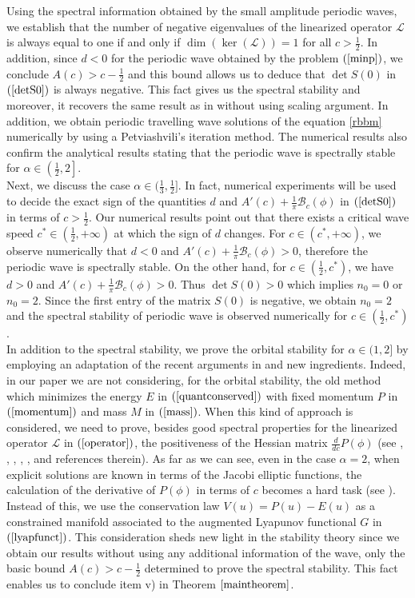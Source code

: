 \documentclass[12pt,reqno]{amsart}
\newcommand{\2}{L^2_{per}(0, T)}
\numberwithin{equation}{section}
\numberwithin{figure}{section}
\begin{document}
\indent Using the spectral information obtained by the small amplitude periodic waves, we establish that the number of negative eigenvalues of the linearized operator $\mathcal{L}$ is always equal to one if and only if $\dim(\ker({\mathcal{L}}))=1$ for all $c>\frac{1}{2}$. In addition, since $d<0$ for the periodic wave obtained by the problem $(\ref{minp})$, we conclude $A(c)>c-\frac{1}{2}$ and this bound allows us to deduce that $\det S(0)$ in $(\ref{detS0})$ is always negative. This fact gives us the spectral stability and moreover, it recovers the same result as in \cite{angulo1} without using scaling argument. In addition, we obtain periodic travelling wave solutions of the equation \eqref{rbbm} numerically by using a Petviashvili's iteration method. The numerical results also confirm the analytical results stating that  the periodic wave is spectrally stable for $\alpha\in\left(\frac{1}{2},2\right]$.\\
\indent Next, we discuss the case $\alpha\in (\frac{1}{3},\frac{1}{2}]$. In fact, numerical experiments will be used to decide the exact sign of the quantities $d$ and $A'(c)+ \frac{1}{\pi}\mathcal{B}_c(\phi)$ in $(\ref{detS0})$ in terms of $c>\frac{1}{2}$. Our numerical results point out that there exists a critical wave speed $c^*\in (\frac{1}{2}, +\infty)$ at which the sign of $d$ changes.
For $c\in(c^*,+\infty)$, we observe numerically that $d<0$ and  $A'(c)+ \frac{1}{\pi}\mathcal{B}_c(\phi) >0$, therefore the periodic wave is spectrally stable. On the other hand, for $c\in(\frac{1}{2}, c^*)$, we have $d>0$ and  $A'(c)+ \frac{1}{\pi}\mathcal{B}_c(\phi)>0$.  Thus $\det S(0)>0$ which implies $n_0=0$ or $n_0=2$. Since the first entry of the matrix $S(0)$ is negative, we obtain $n_0=2$ and the spectral stability of periodic wave is observed numerically  for $c\in(\frac{1}{2}, c^*)$.\\
\indent In addition to the spectral stability, we prove the orbital stability for $\alpha\in(1,2]$ by employing an adaptation of the recent arguments in \cite{CNP} and new ingredients. Indeed, in our paper we are not considering, for the orbital stability, the old method which minimizes the energy $E$ in $(\ref{quantconserved})$ with fixed momentum $P$ in $(\ref{momentum})$ and mass $M$ in $(\ref{mass})$. When this kind of approach is considered, we need to prove, besides good spectral properties for the linearized operator $\mathcal{L}$ in $(\ref{operator})$,  the positiveness  of the  Hessian matrix $\frac{d}{dc}P(\phi)$ (see \cite{ANP}, \cite{an-ban-scia1}, \cite{natali}, \cite{CNP}, \cite{grillakis1}, and references therein). As far as we can see, even in the case $\alpha=2$, when explicit solutions are known in terms of the Jacobi elliptic functions, the calculation of the derivative of $P(\phi)$ in terms of $c$ becomes a hard task (see \cite{an-ban-scia1}). Instead of this, we use the conservation law $V(u)=P(u)-E(u)$ as a constrained manifold associated to the augmented Lyapunov functional $G$ in $(\ref{lyapfunct})$. This consideration sheds new light in the stability theory since we obtain our results without using any additional information of the wave, only the basic bound $A(c)>c-\frac{1}{2}$ determined to prove the spectral stability. This fact enables us to conclude item v) in Theorem $\ref{maintheorem}$.\\
\end{document}
